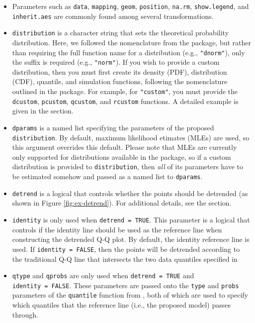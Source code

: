 \begin{itemize}
\item
  Parameters such as \texttt{data}, \texttt{mapping}, \texttt{geom},
  \texttt{position}, \texttt{na.rm}, \texttt{show.legend}, and
  \texttt{inherit.aes} are commonly found among several 
  transformations.
\item
  \texttt{distribution} is a character string that sets the theoretical
  probability distribution. Here, we followed the nomenclature from the
   package, but rather than requiring the full function name
  for a distribution (e.g., \texttt{"dnorm"}), only the suffix is
  required (e.g., \texttt{"norm"}). If you wish to provide a custom
  distribution, then you must first create its density (PDF),
  distribution (CDF), quantile, and simulation functions, following the
  nomenclature outlined in the  package. For example, for
  \texttt{"custom"}, you must provide the \texttt{dcustom},
  \texttt{pcustom}, \texttt{qcustom}, and \texttt{rcustom} functions. A
  detailed example is given in the  section.
\item
  \texttt{dparams} is a named list specifying the parameters of the
  proposed \texttt{distribution}. By default, maximum likelihood
  etimates (MLEs) are used, so this argument overrides this default.
  Please note that MLEs are currently only supported for distributions
  available in the  package, so if a custom distribution is
  provided to \texttt{distribution}, then \emph{all} of its parameters
  have to be estimated somehow and passed as a named list to
  \texttt{dparams}.
\item
  \texttt{detrend} is a logical that controls whether the points should
  be detrended (as shown in Figure \ref{fig:ex-detrend}). For additional
  details, see the  section.
\item
  \texttt{identity} is only used when \texttt{detrend\ =\ TRUE}. This
  parameter is a logical that controls if the identity line should be
  used as the reference line when constructing the detrended Q-Q plot.
  By default, the identity reference line is used. If
  \texttt{identity\ =\ FALSE}, then the points will be detrended
  according to the traditional Q-Q line that intersects the two data
  quantiles specified in 
\item
  \texttt{qtype} and \texttt{qprobs} are only used when
  \texttt{detrend\ =\ TRUE} and \texttt{identity\ =\ FALSE}. These
  parameters are passed onto the \texttt{type} and \texttt{probs}
  parameters of the \texttt{quantile} function from , both of
  which are used to specify which quantiles that the reference line
  (i.e., the proposed model) passes through.
\end{itemize}

